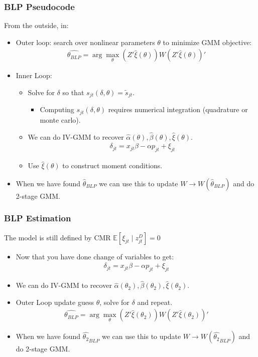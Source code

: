  \begin{frame}
\frametitle{BLP Pseudocode}
\footnotesize
From the outside, in:
\begin{itemize}
\item Outer loop: search over nonlinear parameters $\theta$ to minimize GMM objective:
 \begin{eqnarray*}
 \widehat{\theta_{BLP}} = \arg \max_{\theta} (Z' \hat{\xi}(\theta)) W  (Z' \hat{\xi}(\theta))'
 \end{eqnarray*}
 \item Inner Loop:
 \begin{itemize}
\item Solve for $\delta$ so that $s_{jt}(\delta,\theta) = \tilde{s}_{jt}$.
\begin{itemize}
\item Computing $s_{jt}(\delta,\theta)$ requires numerical integration (quadrature or monte carlo).
\end{itemize}
 \item We can do IV-GMM to recover $\hat{\alpha}(\theta),\hat{\beta}(\theta),\hat{\xi}(\theta)$.
  \begin{eqnarray*}
\delta_{jt}= x_{jt} \beta -\alpha p_{jt}+  \xi_{jt}
 \end{eqnarray*}
  \item Use $\hat{\xi}(\theta)$ to construct moment conditions.
 \end{itemize}
 \item When we have found $\hat{\theta}_{BLP}$ we can use this to update $W \rightarrow W(\hat{\theta}_{BLP})$ and do 2-stage GMM.
 \end{itemize}
\end{frame}




 \begin{frame}
\frametitle{BLP Estimation}
The model is still defined by CMR $\mathbb{E}[\xi_{jt} \mid  z_{jt}^D]=0$
\begin{itemize}
 \item Now that you have done change of variables to get:
 \begin{eqnarray*}
\delta_{jt}= x_{jt} \beta -\alpha p_{jt}+  \xi_{jt}
 \end{eqnarray*}
 \item We can do IV-GMM to recover $\hat{\alpha}(\theta_2),\widehat{\beta}(\theta_2),\widehat{\xi}(\theta_2)$.
 \item Outer Loop update guess $\theta$, solve for $\delta$ and repeat.
 \begin{eqnarray*}
 \widehat{\theta_{BLP}} = \arg \max_{\theta} (Z' \widehat{\xi}(\theta_2)) W  (Z' \widehat{\xi}(\theta_2))'
 \end{eqnarray*}
 \item When we have found $\widehat{\theta_2}_{BLP}$ we can use this to update $W \rightarrow W(\widehat{\theta_2}_{BLP})$ and do 2-stage GMM.
 \end{itemize}
\end{frame}



